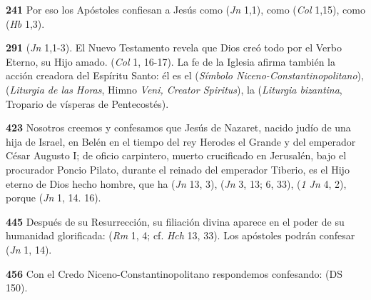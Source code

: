 \begin{body}
\begin{body}
\textbf{241} Por eso los Apóstoles confiesan a Jesús como  (\emph{Jn} 1,1), como  (\emph{Col} 1,15), como  (\emph{Hb} 1,3).

\textbf{291}  (\emph{Jn} 1,1-3). El Nuevo Testamento revela que Dios creó todo por el Verbo Eterno, su Hijo amado.  (\emph{Col} 1, 16-17). La fe de la Iglesia afirma también la acción creadora del Espíritu Santo: él es el  (\emph{Símbolo Niceno-Constantinopolitano}),  (\emph{Liturgia de las Horas}, Himno \emph{Veni, Creator Spiritus}), la  (\emph{Liturgia bizantina}, Tropario de vísperas de Pentecostés).

\textbf{423} Nosotros creemos y confesamos que Jesús de Nazaret, nacido judío de una hija de Israel, en Belén en el tiempo del rey Herodes el Grande y del emperador César Augusto I; de oficio carpintero, muerto crucificado en Jerusalén, bajo el procurador Poncio Pilato, durante el reinado del emperador Tiberio, es el Hijo eterno de Dios hecho hombre, que ha  (\emph{Jn} 13, 3),  (\emph{Jn} 3, 13; 6, 33),  (\emph{1 Jn} 4, 2), porque  (\emph{Jn} 1, 14. 16).

\textbf{445} Después de su Resurrección, su filiación divina aparece en el poder de su humanidad glorificada:  (\emph{Rm} 1, 4; cf. \emph{Hch} 13, 33). Los apóstoles podrán confesar  (\emph{Jn} 1, 14).

\textbf{456} Con el Credo Niceno-Constantinopolitano respondemos confesando:  (DS 150).


\end{body}
\end{body}
